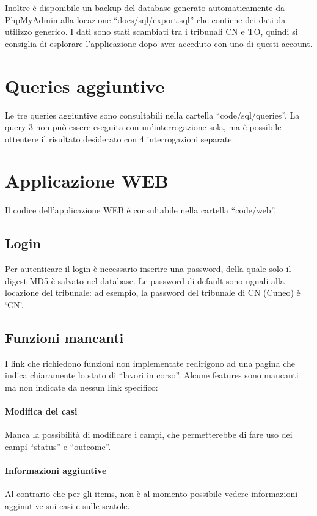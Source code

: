 {Inoltre è disponibile un backup del database generato automaticamente da PhpMyAdmin alla locazione ``docs/sql/export.sql'' che contiene dei dati da utilizzo generico. I dati sono stati scambiati tra i tribunali CN e TO, quindi si consiglia di esplorare l'applicazione dopo aver acceduto con uno di questi account.

\section{Queries aggiuntive}

Le tre queries aggiuntive sono consultabili nella cartella ``code/sql/queries''. La query 3 non può essere eseguita con un'interrogazione sola, ma è possibile ottentere il risultato desiderato con 4 interrogazioni separate.

\section{Applicazione WEB}

Il codice dell'applicazione WEB è consultabile nella cartella ``code/web''.

\subsection{Login}

Per autenticare il login è necessario inserire una password, della quale solo il digest MD5 è salvato nel database. Le password di default sono uguali alla locazione del tribunale: ad esempio, la password del tribunale di CN (Cuneo) è `CN'.

\subsection{Funzioni mancanti}

I link che richiedono funzioni non implementate redirigono ad una pagina che indica chiaramente lo stato di ``lavori in corso''. Alcune features sono mancanti ma non indicate da nessun link specifico:

\paragraph{Modifica dei casi}
Manca la possibilità di modificare i campi, che permetterebbe di fare uso dei campi ``status'' e ``outcome''.

\paragraph{Informazioni aggiuntive}
Al contrario che per gli items, non è al momento possibile vedere informazioni agginutive sui casi e sulle scatole.

}
